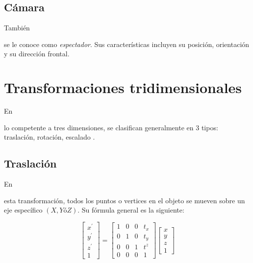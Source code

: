 \documentclass[stu, 12pt, letterpaper, donotrepeattitle, floatsintext, natbib]{apa7}
\begin{document}
    \subsection{Cámara}
    También \begin{justifying}
        se le conoce como \emph{espectador}. Sus características incluyen su posición, orientación y su dirección frontal.\par
    \end{justifying}
    \vspace{\baselineskip}
    \section{Transformaciones tridimensionales}
    En \begin{justifying}
        lo competente a tres dimensiones, se clasifican generalmente en 3 tipos: traslación, rotación, escalado \citep{multimedia-applications-division-freescale-semiconductor-inc-2010}.\par %
    \end{justifying}
    \subsection{Traslación}
    En \begin{justifying}
        esta transformación, todos los puntos o vertices en el objeto se mueven sobre un eje específico \((X, Y \text{ó} Z)\). Su fórmula general es la siguiente:\par
    \end{justifying}
    \begin{equation*}
        \begin{bmatrix}
            x^{\prime}\\
            y^{\prime}\\
            z^{\prime}\\
            1
        \end{bmatrix}=
        \begin{bmatrix}
            1&0&0&t_x\\
            0&1&0&t_y\\
            0&0&1&t^z\\
            0&0&0&1
        \end{bmatrix}
        \begin{bmatrix}
            x\\
            y\\
            z\\
            1
        \end{bmatrix}
    \end{equation*}
    \vspace{\baselineskip}
\end{document}
